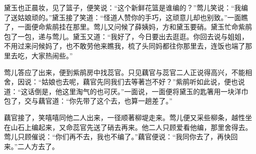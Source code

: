 \begin{parag}
    黛玉也正晨妆，见了篮子，便笑说：“这个新鲜花篮是谁编的？”莺儿笑说：“我编了送姑娘顽的。”黛玉接了笑道：“怪道人赞你的手巧，这顽意儿却也别致。”一面瞧了，一面便命紫鹃挂在那里。莺儿又问候了薛姨妈，方和黛玉要硝。黛玉忙命紫鹃包了一包，递与莺儿。黛玉又道：“我好了，今日要出去逛逛。你回去说与姐姐，不用过来问候妈了，也不敢劳他来瞧我，梳了头同妈都往你那里去，连饭也端了那里去吃，大家热闹些。”
\end{parag}


\begin{parag}
    莺儿答应了出来，便到紫鹃房中找蕊官。只见藕官与蕊官二人正说得高兴，不能相舍，因说：“姑娘也去呢，藕官先同我们去等著岂不好？”紫鹃听如此说，便也说道：“这话倒是，他这里淘气的也可厌。”一面说，一面便将黛玉的匙箸用一块洋巾包了，交与藕官道：“你先带了这个去，也算一趟差了。”
\end{parag}


\begin{parag}
    藕官接了，笑嘻嘻同他二人出来，一径顺著柳堤走来。莺儿便又采些柳条，越性坐在山石上编起来，又命蕊官先送了硝去再来。他二人只顾爱看他编，那里舍得去。莺儿只顾催说：“你们再不去，我也不编了。”藕官便说：“我同你去了，再快回来。”二人方去了。
\end{parag}


